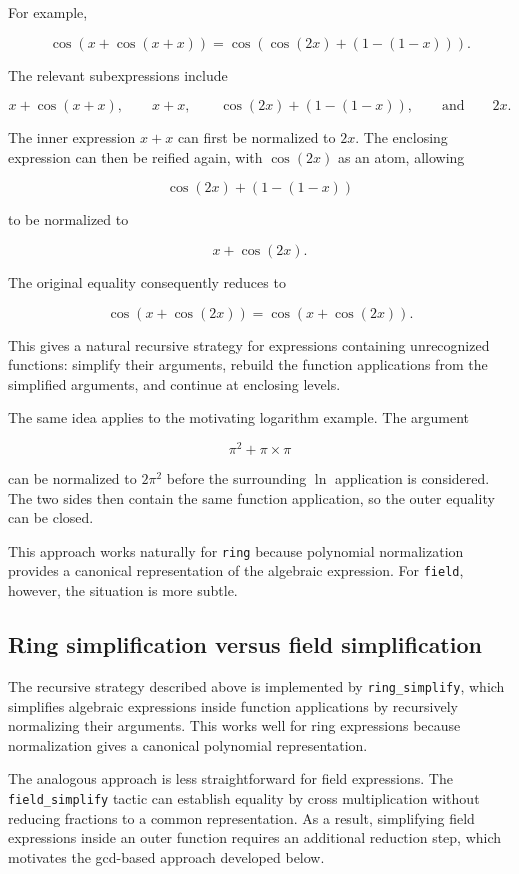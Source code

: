 \documentclass[11pt]{article}
\begin{document}
For example,

$$
  \cos(x+\cos(x+x))
  =
  \cos(\cos(2x)+(1-(1-x))).
$$

The relevant subexpressions include

$$
  x+\cos(x+x),\qquad
  x+x,\qquad
  \cos(2x)+(1-(1-x)),
  \qquad\text{and}\qquad
  2x.
$$

The inner expression $x+x$ can first be normalized to $2x$. The enclosing expression can then be reified again, with $\cos(2x)$ as an atom, allowing

$$
  \cos(2x)+(1-(1-x))
$$

to be normalized to

$$
  x+\cos(2x).
$$

The original equality consequently reduces to

$$
  \cos(x+\cos(2x))
  =
  \cos(x+\cos(2x)).
$$

This gives a natural recursive strategy for expressions containing unrecognized
functions: simplify their arguments, rebuild the function applications from
the simplified arguments, and continue at enclosing levels.

The same idea applies to the motivating logarithm example. The argument

$$
  \pi^2+\pi\mathbin{\times}\pi
$$

can be normalized to $2\pi^2$ before the surrounding $\ln$ application is considered. The two sides then contain the same function application, so the outer equality can be closed.

This approach works naturally for \texttt{ring} because polynomial normalization provides a canonical representation of the algebraic expression. For \texttt{field}, however, the situation is more subtle.
\subsection{Ring simplification versus field simplification}

The recursive strategy described above is implemented by \texttt{ring\_simplify}, which simplifies algebraic expressions inside function applications by recursively normalizing their arguments. This works well for ring expressions because normalization gives a canonical polynomial representation.

The analogous approach is less straightforward for field expressions. The \texttt{field\_simplify} tactic can establish equality by cross multiplication without reducing fractions to a common representation. As a result, simplifying field expressions inside an outer function requires an additional reduction step, which motivates the gcd-based approach developed below.
\end{document}
